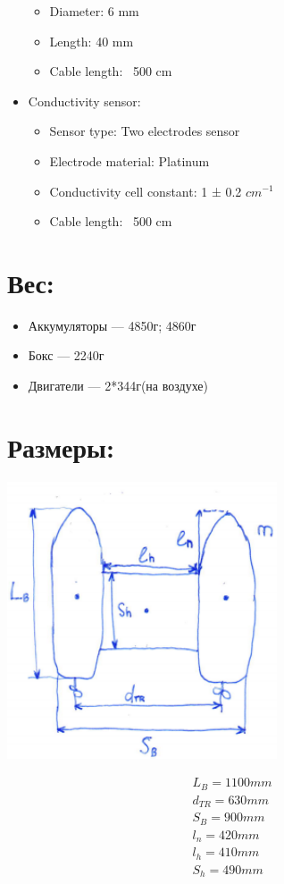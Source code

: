 \begin{itemize}
\begin{itemize}
        \item Diameter: 6 mm
        \item Length: 40 mm
        \item Cable length: ~500 cm
    \end{itemize}
    \item Conductivity sensor: \\
    \begin{itemize}
        \item Sensor type: Two electrodes sensor
        \item Electrode material: Platinum
        \item Conductivity cell constant: 1 ± 0.2 ${cm^{-1}}$
        \item Cable length: ~500 cm
    \end{itemize}
    
\end{itemize}

\section*{Вес:}

\begin{itemize}
    \item Аккумуляторы --- 4850г; 4860г
    \item Бокс --- 2240г
    \item Двигатели --- 2*344г(на воздухе)
\end{itemize}

\section*{Размеры:}

\begin{center}
        \includegraphics[width=0.6\textwidth]{img/boat-size.png}\\
\end{center} 
    
\begin{eqnarray*}
    L_B = 1100 mm \\
    d_{TR} = 630 mm \\
    S_B = 900 mm \\
    l_n = 420 mm \\
    l_h = 410 mm \\
    S_h = 490 mm
\end{eqnarray*}

